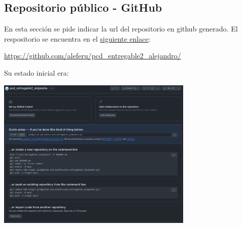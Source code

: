 \subsection{Repositorio público - GitHub}

En esta sección se pide indicar la url del repositorio en github generado. El respositorio se encuentra en el \href{https://github.com/aleferu/pcd_entregable2_alejandro/}{siguiente enlace}:

\begin{center}
    \url{https://github.com/aleferu/pcd_entregable2_alejandro/}
\end{center}

Su estado inicial era:

\begin{center}
    \includegraphics[width=0.7\textwidth]{img/repositorio-online-creado.png}
\end{center}
